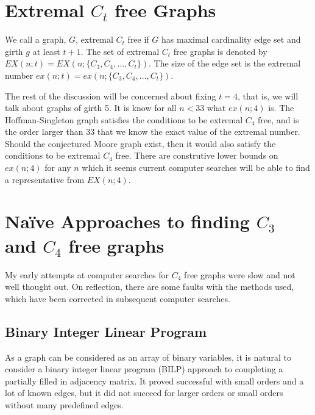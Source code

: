 \documentclass[a4paper]{article}
\begin{document}
\section{Extremal $C_t$ free Graphs}
We call a graph, $G$, extremal $C_t$ free if $G$ has maximal cardinality edge set and girth $g$ at least $t+1$. The set of extremal $C_t$ free graphs is denoted by $EX(n; t)=EX(n;\{C_3, C_4,\ldots,C_t\})$. The size of the edge set is the extremal number $ex(n; t)=ex(n; \{C_3, C_4, \ldots, C_t\})$.

The rest of the discussion will be concerned about fixing $t=4$, that is, we will talk about graphs of girth 5. It is know for all $n<33$ what $ex(n; 4)$ is. The Hoffman-Singleton graph satisfies the conditions to be extremal $C_4$ free, and is the order larger than 33 that we know the exact value of the extremal number. Should the conjectured Moore graph exist, then it would also satisfy the conditions to be extremal $C_4$ free. There are construtive lower bounds on $ex(n; 4)$ for any $n$ which it seems current computer searches will be able to find a representative from $EX(n; 4)$.

\section{Na\"ive Approaches to finding $C_3$ and $C_4$ free graphs}
My early attempts at computer searches for $C_4$ free graphs were slow and not well thought out. On reflection, there are some faults with the methods used, which have been corrected in subsequent computer searches.
\subsection{Binary Integer Linear Program}
As a graph can be considered as an array of binary variables, it is natural to consider a binary integer linear program (BILP) approach to completing a partially filled in adjacency matrix. It proved successful with small orders and a lot of known edges, but it did not succeed for larger orders or small orders without many predefined edges.
\end{document}

